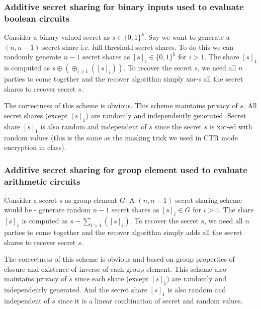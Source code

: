\documentclass[11pt]{article}
\begin{document}
\subsubsection*{Additive secret sharing for binary inputs used to evaluate boolean circuits}
Consider a binary valued secret as $s \in \{0,1\}^k$. Say we want to generate a $(n, n-1)$ secret share i.e. full threshold secret shares. To do this we can randomly generate $n-1$ secret shares as $[s]_i \in \{0,1\}^k$ for $i > 1$. The share $[s]_1$ is computed as $s \oplus (\oplus_{i > 1}([s]_i))$. To recover the secret $s$, we need all $n$ parties to come together and the recover algorithm simply xor-s all the secret shares to recover secret $s$.

The correctness of this scheme is obvious. This scheme maintains privacy of $s$. All secret shares (except $[s]_1$) are randomly and independently generated. Secret share $[s]_1$ is also random and independent of $s$ since the secret $s$ is xor-ed with random values (this is the same as the masking trick we used in CTR mode encryption in class).

\subsubsection*{Additive secret sharing for group element used to evaluate arithmetic circuits}
Consider a secret $s$ as group element $G$. A $(n, n-1)$ secret sharing scheme would be - generate random $n-1$ secret shares as $[s]_i \in G$ for $i > 1$. The share $[s]_1$ is computed as $s - \sum_{i > 1}([s]_i)$. To recover the secret $s$, we need all $n$ parties to come together and the recover algorithm simply adds all the secret shares to recover secret $s$.

The correctness of this scheme is obvious and based on group properties of closure and existence of inverse of each group element. This scheme also maintains privacy of $s$ since each share (except $[s]_1$) are randomly and independently generated. And the secret share $[s]_1$ is also random and independent of $s$ since it is a linear combination of secret and random values.
\end{document}
